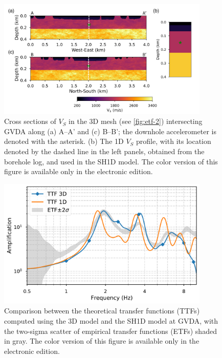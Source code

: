 {\clearpage
\begin{figure}[!ht]
  \centering
  \includegraphics[width=0.9\textwidth]{figures/figure_etf_3.pdf}
  \caption{Cross sections of $V_S$ in the 3D mesh (see \cref{fig:etf-2}) intersecting GVDA along (a) A–A' and (c) B–B'; the downhole accelerometer is denoted with the asterisk. (b) The 1D $V_S$ profile, with its location denoted by the dashed line in the left panels, obtained from the borehole log, and used in the SH1D model. The color version of this figure is available only in the electronic edition.}
  \label{fig:etf-3}
\end{figure}

\clearpage
\begin{figure}[!ht]
  \centering
  \includegraphics[width=0.9\textwidth]{figures/figure_etf_4.pdf}
  \caption{Comparison between the theoretical transfer functions (TTFs) computed using the 3D model and the SH1D model at GVDA, with the two-sigma scatter of empirical transfer functions (ETFs) shaded in gray. The color version of this figure is available only in the electronic edition.}
  \label{fig:etf-4}
\end{figure}

}
